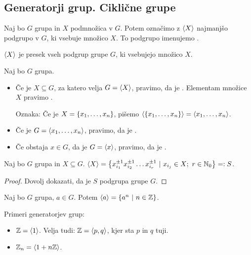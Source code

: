 \subsection{Generatorji grup. Ciklične grupe}

\begin{definicija}
    Naj bo $G$ grupa in $X$ podmnožica v $G$. Potem označimo z $\left\langle {X} \right\rangle$ najmanjšo podgrupo v $G$, ki vsebuje množico $X$. To podgrupo imenujemo .
\end{definicija}

\begin{opomba}
    $\left\langle {X} \right\rangle$ je presek vseh podgrup grupe $G$, ki vsebujejo množico $X$.
\end{opomba}

\begin{definicija}
    Naj bo $G$ grupa. 
    
    \begin{itemize}
        \item Če je $X \subseteq G$, za katero velja $G = \left\langle {X} \right\rangle$, pravimo, da je . Elementam množice $X$ pravimo .
        
        Oznaka: Če je $X = \left\{x_1, \ldots, x_n\right\}$, pišemo $\left\langle {\left\{x_1, \ldots, x_n\right\}} \right\rangle = \left\langle {x_1, \ldots, x_n} \right\rangle$.
        \item Če je $G = \left\langle {x_1, \ldots, x_n} \right\rangle$, pravimo, da je .
        \item Če obstaja $x \in G$, da je $G = \left\langle {x} \right\rangle$, pravimo, da je .
    \end{itemize}    
\end{definicija}

\begin{trditev}
    Naj bo $G$ grupa in $X \subseteq G$. $\left\langle {X} \right\rangle = \left\{x_{i_1}^{\pm 1} x_{i_2}^{\pm 1} \ldots x_{i_r}^{\pm 1} \ | \ x_{i_j} \in X; \ r \in \mathbb{N}_0\right\} =: S$.
\end{trditev}

\begin{proof}
    Dovolj dokazati, da je $S$ podgrupa grupe $G$.
\end{proof}

\begin{posledica}
    Naj bo $G$ grupa, $a \in G$. Potem $\left\langle {a} \right\rangle = \left\{a^n \ | \ n \in \mathbb{Z}\right\}$.
\end{posledica}

\begin{primer}
    Primeri generatorjev grup:
    \begin{itemize}
        \item $\mathbb{Z} = \left\langle {1} \right\rangle$. Velja tudi: $\mathbb{Z} = \left\langle {p, q} \right\rangle$, kjer sta $p$ in $q$ tuji.
        \item $\mathbb{Z}_n = \left\langle {1 + n\mathbb{Z}} \right\rangle$.
    \end{itemize}
\end{primer}

